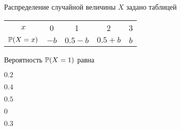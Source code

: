 
\begin{question}
Распределение случайной величины \(X\) задано таблицей

\begin{center}
\begin{tabular}{ccccc}
\toprule
$x$ & 0 & 1 & 2 & 3 \\ 
$\P(X=x)$ & $-b$ & $0.5-b$ & $0.5+b$ & $b$ \\
\bottomrule
\end{tabular}
\end{center}

Вероятность \(\P(X=1)\) равна
\begin{answerlist}
  \item \(0.2\)
  \item \(0.4\)
  \item \(0.5\)
  \item \(0\)
  \item \(0.3\)
\end{answerlist}
\end{question}


